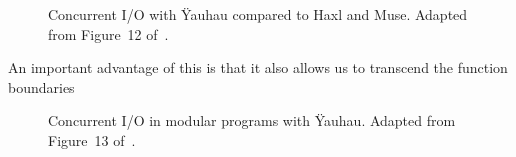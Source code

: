 \begin{figure}[t]
    	\centering
		\caption{Concurrent \ac{I/O} with \"{Y}auhau compared to Haxl and Muse. Adapted from Figure~12 of~\cite{ertel_cc18}.}	
		\label{fig:yauhau_io-imbalance}
	\end{figure}

An important advantage of this is that it also allows us to transcend the function boundaries
  
\begin{figure}[t]
	\centering
	\caption{Concurrent \ac{I/O} in modular programs with \"{Y}auhau. Adapted from Figure~13 of~\cite{ertel_cc18}.}
	\label{fig:yauhau_efficient-modularity}
\end{figure}
